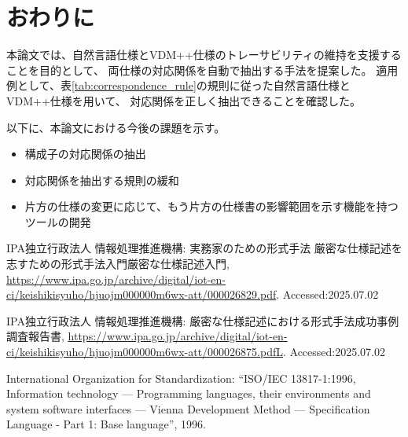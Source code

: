 \documentclass[a4j,twocolumn,10pt]{jceee-kyushu-euc}
\begin{document}
\section{おわりに}
本論文では、自然言語仕様とVDM++仕様のトレーサビリティの維持を支援することを目的として、
両仕様の対応関係を自動で抽出する手法を提案した。
適用例として、表\ref{tab:correspondence_rule}の規則に従った自然言語仕様とVDM++仕様を用いて、
対応関係を正しく抽出できることを確認した。

以下に、本論文における今後の課題を示す。
\begin{itemize}
      \setlength{\itemsep}{-2pt}
      \item 構成子の対応関係の抽出
      \item 対応関係を抽出する規則の緩和
      \item 片方の仕様の変更に応じて、もう片方の仕様書の影響範囲を示す機能を持つツールの開発 %
\end{itemize}

\begin{thebibliography}{99}
      IPA独立行政法人 情報処理推進機構: 実務家のための形式手法\space
      厳密な仕様記述を志すための形式手法入門\space 厳密な仕様記述入門,
      \url{https://www.ipa.go.jp/archive/digital/iot-en-ci/keishikisyuho/hjuojm000000m6wx-att/000026829.pdf}. Accessed:2025.07.02

      IPA独立行政法人 情報処理推進機構: 厳密な仕様記述における形式手法成功事例調査報告書,
      \url{https://www.ipa.go.jp/archive/digital/iot-en-ci/keishikisyuho/hjuojm000000m6wx-att/000026875.pdfL}. Accessed:2025.07.02

      International Organization for Standardization: ``ISO/IEC 13817-1:1996,
      Information technology — Programming languages, their environments and system software interfaces
      — Vienna Development Method — Specification Language - Part 1: Base language'', 1996.
\end{thebibliography}
\end{document}
